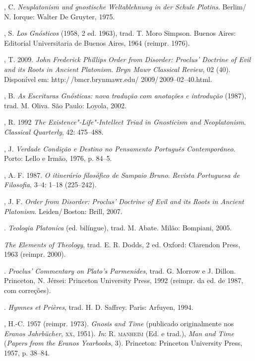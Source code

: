 \begin{description}
, C. \textit{Neuplatonism und gnostische Weltablehnung in
der Schule Plotins}. Berlim/\,N. Iorque: Walter De Gruyter, 1975.

, S. \textit{Los Gnósticos} (1958, 2 ed. 1963), trad. T.
Moro Simpson. Buenos Aires: Editorial Universitaria de Buenos
Aires, 1964 (reimpr. 1976).

, T. 2009. \textit{John Frederick Phillips}\textit{\emph{
Order from Disorder: Proclus' Doctrine of Evil and its Roots in
Ancient Platonism}}. \emph{Bryn Mawr Classical Review}, 02
(40). Disponível em: http:/\,/bmcr.brynmawr.edu/
2009/\,2009--02--40.html.

, B. \textit{As Escrituras Gnósticas: nova tradução com
anotações e introdução} (1987), trad. M. Oliva. São Paulo:
Loyola, 2002.

, R. 1992 \textit{The Existence"-Life"-Intellect Triad in
Gnosticism and Neoplatonism}. \emph{Classical Quarterly}, 42:
475--488.

, J. \textit{Verdade Condição e Destino no Pensamento
Português Contemporâneo}. Porto: Lello e Irmão, 1976, p. 84--5.

, A. F. 1987. \textit{O itinerário filosófico de Sampaio
Bruno}. \emph{Revista Portuguesa de Filosofia}, 3--4: 1--18
(225--242).

, J. F. \textit{Order from Disorder: Proclus' Doctrine of
Evil and its Roots in Ancient Platonism}. Leiden/\,Boston: Brill,
2007.

. \textit{Teologia Platonica} (ed. bilíngue), trad. M.
Abate. Milão: Bompiani, 2005.

 \textit{The Elements of Theology}, trad. E. R.
Dodds, 2 ed. Oxford: Clarendon Press, 1963 (reimpr.
2000).

. \textit{Proclus' Commentary on Plato's}
\textit{\emph{Parmenides}}, trad. G. Morrow e J. Dillon.
Princeton, N. Jérsei: Princeton University Press, 1992 (reimpr.
da ed. de 1987, com correções).

. \textit{Hymnes et Prières}, trad. H. D. Saffrey. Paris:
Arfuyen, 1994.

, H.-C. 1957 (reimpr. 1973). \textit{Gnosis and Time}
(publicado originalmente nos \emph{Eranos Jahrbücher}, \textsc{xx},
1951). \emph{In}: R. \textsc{manheim} (Ed. e trad.), \textit{Man and
Time} (\emph{Papers from the Eranos Yearbooks}, 3). Princeton:
Princeton University Press, 1957, p. 38--84.


\end{description}

